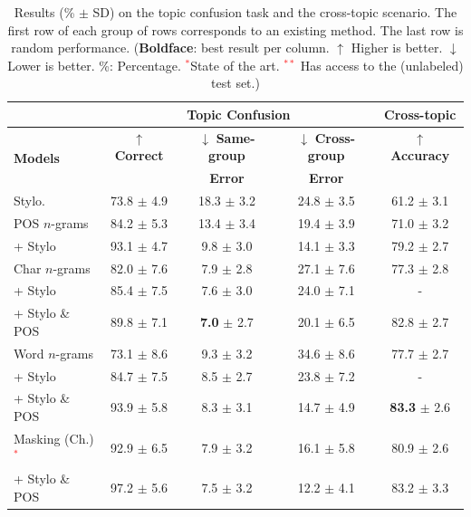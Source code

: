 \documentclass[11pt]{article}
\begin{document}
\begin{table}[htb]
\centering
\caption{\label{tbl:topicConf}Results (\% $\pm$ SD) on the topic confusion task and the cross-topic scenario. The first row of each group of rows corresponds to an existing method. The last row is random performance. (\textbf{Boldface}: best result per column. $\uparrow$ Higher is better. $\downarrow$ Lower is better. \%: Percentage. \textcolor{red}{$^{*}$}State of the art. \textcolor{red}{$^{**}$} Has access to the (unlabeled) test set.)
}
\begin{tabular}{l|ccc|||c}
\hline
& \multicolumn{3}{c|||}{\textbf{Topic Confusion}}& \textbf{Cross-topic}    \\\hline
\multirow{2}{*}{\textbf{Models}}  & $\uparrow$ \textbf{Correct} & $\downarrow$ \textbf{Same-group} & $\downarrow$ \textbf{Cross-group} & \textbf{$\uparrow$ Accuracy} \\
 &  & \textbf{Error} & \textbf{Error} &   \\\hline\hline 
 
 Stylo. &   73.8 $\pm$ 4.9 & 18.3 $\pm$ 3.2 & 24.8 $\pm$ 3.5 &  61.2 $\pm$ 3.1\\\hline
 POS $n$-grams &	84.2 $\pm$ 5.3& 13.4 $\pm$ 3.4	& 	19.4 $\pm$ 3.9& 71.0 $\pm$ 3.2\\
\phantom{hi} + Stylo       & 93.1 $\pm$ 4.7&   9.8 $\pm$ 3.0 & 14.1 $\pm$ 3.3 & 79.2 $\pm$ 2.7  \\\hline
						
 Char $n$-grams  & 82.0 $\pm$ 7.6 & 7.9 $\pm$ 2.8 & 27.1 $\pm$ 7.6 & 77.3 $\pm$ 2.8 \\			
 \phantom{hi}+ Stylo & 85.4 $\pm$  7.5& 7.6 $\pm$ 3.0 & 24.0 $\pm$ 7.1 & - \\
\phantom{hi}+ Stylo \& POS & 89.8 $\pm$ 7.1 & \textbf{7.0} $\pm$ 2.7 & 20.1 $\pm$ 6.5 & 82.8 $\pm$ 2.7\\\hline

 Word $n$-grams & 73.1 $\pm$ 8.6 & 9.3 $\pm$ 3.2 & 34.6 $\pm$ 8.6 & 77.7 $\pm$ 2.7\\
 \phantom{hi}+ Stylo & 84.7 $\pm$ 7.5 & 8.5 $\pm$ 2.7 & 23.8 $\pm$ 7.2 & - \\
 \phantom{hi}+ Stylo \& POS  & 93.9 $\pm$ 5.8 & 8.3 $\pm$ 3.1 & 14.7 $\pm$ 4.9 & \textbf{83.3} $\pm$ 2.6\\
\hline
			
  Masking (Ch.)\textcolor{red}{$^{*}$} & 92.9 $\pm$ 6.5 & 7.9 $\pm$ 3.2 & 16.1 $\pm$ 5.8  & 80.9 $\pm$ 2.6\\
  \phantom{hi}+ Stylo \& POS & 97.2 $\pm$ 5.6 & 7.5 $\pm$ 3.2 & 12.2 $\pm$ 4.1 & 83.2  $\pm$ 3.3\\\hline


\end{tabular}
\end{table}
\end{document}
